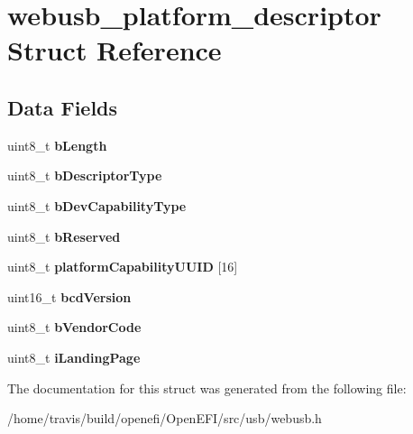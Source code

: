 \hypertarget{structwebusb__platform__descriptor}{}\section{webusb\+\_\+platform\+\_\+descriptor Struct Reference}
\label{structwebusb__platform__descriptor}
\subsection*{Data Fields}
\begin{DoxyCompactItemize}
\item 
\mbox{\label{structwebusb__platform__descriptor_affdc82ed98f91df1f86ff5b31daba385}} 
uint8\+\_\+t {\bfseries b\+Length}
\item 
\mbox{\label{structwebusb__platform__descriptor_ad096201d7369d85b61e5ef41f81004b0}} 
uint8\+\_\+t {\bfseries b\+Descriptor\+Type}
\item 
\mbox{\label{structwebusb__platform__descriptor_ad41c111aafa4eca6b5da3f7ca165faf9}} 
uint8\+\_\+t {\bfseries b\+Dev\+Capability\+Type}
\item 
\mbox{\label{structwebusb__platform__descriptor_a5ba769fdb24b6ae8835f22c18e9f0f39}} 
uint8\+\_\+t {\bfseries b\+Reserved}
\item 
\mbox{\label{structwebusb__platform__descriptor_a5051b237a5f4ae27e339477cf938763d}} 
uint8\+\_\+t {\bfseries platform\+Capability\+U\+U\+ID} \mbox{[}16\mbox{]}
\item 
\mbox{\label{structwebusb__platform__descriptor_a4e7761e12b7502d5281b61d23ac5f69c}} 
uint16\+\_\+t {\bfseries bcd\+Version}
\item 
\mbox{\label{structwebusb__platform__descriptor_ad16fde219153472eb8508a081bc132c8}} 
uint8\+\_\+t {\bfseries b\+Vendor\+Code}
\item 
\mbox{\label{structwebusb__platform__descriptor_a2139665bb12a11386286837347d3777e}} 
uint8\+\_\+t {\bfseries i\+Landing\+Page}
\end{DoxyCompactItemize}


The documentation for this struct was generated from the following file\+:\begin{DoxyCompactItemize}
\item 
/home/travis/build/openefi/\+Open\+E\+F\+I/src/usb/webusb.\+h\end{DoxyCompactItemize}

